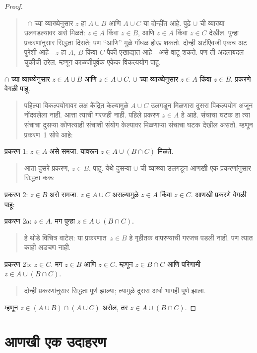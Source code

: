 \begin{proof}
\begin{quote}
~$\cap$ च्या व्याख्येनुसार $z$ हा $A \cup B$ आणि $A \cup C$ या दोन्हींत आहे. पुढे $\cup$ ची व्याख्या उलगडल्यावर असे मिळते: $z \in A$ किंवा $z \in B$, आणि $z \in A$ किंवा $z \in C$ देखील. पुन्हा प्रकरणांनुसार सिद्धता दिसते; पण “आणि” मुळे गोंधळ होऊ शकतो. दोन्ही अटींऐवजी एकच अट पुरेशी आहे---$z$ हा $A$, $B$ किंवा $C$ पैकी एखाद्यात आहे---असे वाटू शकते. पण ती अदलाबदल चुकीची ठरेल. म्हणून काळजीपूर्वक एकेक विकल्पयोग पाहू.
\end{quote}
$\cap$ च्या व्याख्येनुसार $z \in A \cup B$ आणि $z \in A \cup C$. $\cup$ च्या व्याख्येनुसार $z \in A$ किंवा $z \in B$. प्रकरणे वेगळी पाहू.
\begin{quote}
पहिल्या विकल्पयोगावर लक्ष केंद्रित केल्यामुळे $A \cup C$ उलगडून मिळणारा दुसरा विकल्पयोग अजून नोंदवलेला नाही. आत्ता त्याची गरजही नाही. पहिले प्रकरण $z \in A$ हे आहे. संचाचा घटक हा त्या संचाचा दुसऱ्या कोणत्याही संचाशी संयोग केल्यावर मिळणाऱ्या संचाचा घटक देखील असतो. म्हणून प्रकरण~1 सोपे आहे:
\end{quote}
प्रकरण 1: $z \in A$ असे समजा. यावरून $z \in A \cup (B \cap C)$ मिळते.
\begin{quote}
आता दुसरे प्रकरण, $z \in B$, पाहू. येथे दुसऱ्या $\cup$ ची व्याख्या उलगडून आणखी एक प्रकरणांनुसार सिद्धता करू:
\end{quote}
प्रकरण 2: $z \in B$ असे समजा. $z \in A \cup C$ असल्यामुळे $z \in A$ किंवा $z \in C$. आणखी प्रकरणे वेगळी पाहू:

प्रकरण 2a: $z \in A$. मग पुन्हा $z \in A \cup (B \cap C)$.
\begin{quote}
हे थोडे विचित्र वाटेल: या प्रकरणात~$z \in B$ हे गृहीतक वापरण्याची गरजच पडली नाही. पण त्यात काही अडचण नाही.
\end{quote}
प्रकरण 2b: $z \in C$. मग $z \in B$ आणि $z \in C$. म्हणून $z \in B \cap C$ आणि परिणामी $z \in A \cup (B \cap C)$.
\begin{quote}
दोन्ही प्रकरणांनुसार सिद्धता पूर्ण झाल्या; त्यामुळे दुसरा अर्धा भागही पूर्ण झाला.
\end{quote}
म्हणून $z \in (A \cup B) \cap (A \cup C)$ असेल, तर $z \in A \cup (B \cap C)$.
\end{proof}












\section{आणखी एक उदाहरण}\label{mth:prf:ex2:sec}


